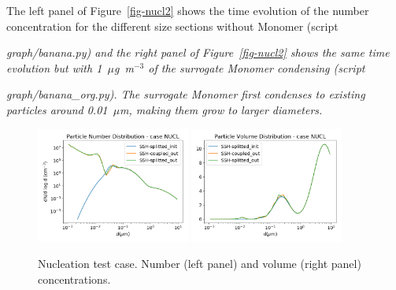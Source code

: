 \documentclass[a4paper,11pt]{article}
\begin{document}
The left panel of Figure~\ref{fig-nucl2} shows the time evolution of the number concentration for the different size sections without Monomer (script {\it{graph/banana.py}) and 
the right panel of Figure~\ref{fig-nucl2} shows the same time evolution but with 1~$\mu$g~m$^{-3}$ of the surrogate Monomer condensing (script {\it{graph/banana\_org.py}). 
The surrogate Monomer first condenses to existing particles around 0.01~$\mu$m, making them grow to larger diameters.

\begin{figure}[H]
        \begin{center}
                \includegraphics[angle=0,width=0.45\textwidth]{../graph/figure_ref/dNdlogd_nucl.png}
                \includegraphics[angle=0,width=0.45\textwidth]{../graph/figure_ref/dVdlogd_nucl.png}
        \end{center}
\caption{Nucleation test case. Number (left panel) and volume (right panel) concentrations.}
\label{fig-nucl}
\end{figure}

}}
\end{document}
